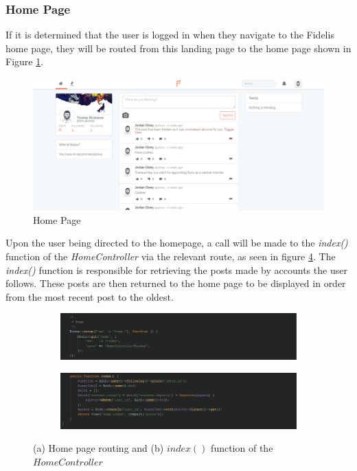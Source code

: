 \subsubsection{Home Page}
If it is determined that the user is logged in when they navigate to the Fidelis home page, they will be routed from this landing page to the home page shown in Figure \ref{fig:HomeAuthorised}.

\begin{figure}[H]
\centering
\includegraphics[width=\textwidth]{Images/Implementation/home_authorised}
\caption{Home Page}
\label{fig:HomeAuthorised}
\end{figure}

Upon the user being directed to the homepage, a call will be made to the \textit{index()} function of the \textit{HomeController} via the relevant route, as seen in figure \ref{fig:HomeRoutingController}. The \textit{index()} function is responsible for retrieving the posts made by accounts the user follows. These posts are then returned to the home page to be displayed in order from the most recent post to the oldest.

\begin{figure}[H]
\centering
\begin{subfigure}[b]{1\linewidth}
    \includegraphics[width=\textwidth]{Images/Implementation/HomeRouting}
    \caption{}
    \label{fig:HomeRouting}
\end{subfigure}
\begin{subfigure}[b]{1\linewidth}
    \includegraphics[width=1\textwidth]{Images/Implementation/HomeControllerIndexFunction}
    \caption{}
    \label{fig:HomeControllerIndexFunction}
\end{subfigure}
\caption{(a) Home page routing and (b) $index()$ function of the $HomeController$}
\label{fig:HomeRoutingController}
\end{figure}

